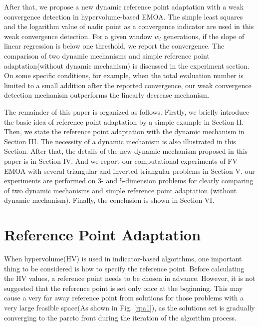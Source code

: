 \documentclass[conference]{IEEEtran}
\begin{document}
After that, we propose a new dynamic reference point adaptation with a weak convergence detection in hypervolume-based EMOA. 
The simple least squares and the logarithm value of nadir point as a convergence indicator are used in this weak convergence detection. 
For a given window $w_l$ generations, if the slope of linear regression is below one threshold, we report the convergence.
The comparison of two dynamic mechanisms and simple reference point adaptation(without dynamic mechanism) is 
discussed in the experiment section. On some specific conditions, for example, when the total evaluation number 
is limited to a small addition after the reported convergence, our weak convergence detection mechanism 
outperforms the linearly decrease mechanism. 

The remainder of this paper is organized as follows. 
Firstly, we briefly introduce the basic idea of reference point adaptation by a simple example in Section II.
Then, we state the reference point adaptation with the dynamic mechanism in Section III.
The necessity of a dynamic mechanism is also illustrated in this Section. After that,
the details of the new dynamic mechanism proposed in this paper is in Section IV. 
And we report our computational experiments of FV-EMOA
with several triangular and inverted-triangular problems in Section V. our experiments are performed on
3- and 5-dimension problems for clearly comparing of two dynamic mechanisms and 
simple reference point adaptation (without dynamic mechanism). Finally, the conclusion is shown in Section VI.

%
%
\section{Reference Point Adaptation}
When hypervolume(HV) is used in indicator-based algorithms, 
one important thing to be considered is how to specify the reference point.
Before calculating the HV values, a reference point needs to be chosen in advance.
However, it is not suggested that the reference point is set only once at the beginning. 
This may cause a very far away reference point from solutions
for those problems with a very large feasible space(As shown in Fig. \ref{rpa1}),
as the solutions set is gradually converging to the pareto front
during the iteration of the algorithm process.
\end{document}
